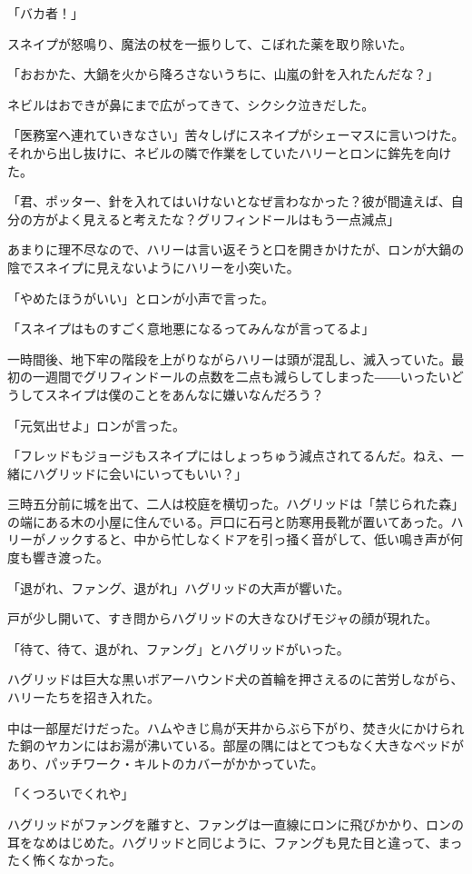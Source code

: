 \documentclass[10pt,a4paper]{article}
\begin{document}
\begin{CJK}{UTF8}{min}
「バカ者！」

スネイプが怒鳴り、魔法の杖を一振りして、こぼれた薬を取り除いた。

「おおかた、大鍋を火から降ろさないうちに、山嵐の針を入れたんだな？」

ネビルはおできが鼻にまで広がってきて、シクシク泣きだした。

「医務室へ連れていきなさい」苦々しげにスネイプがシェーマスに言いつけた。それから出し抜けに、ネビルの隣で作業をしていたハリーとロンに鉾先を向けた。

「君、ポッター、針を入れてはいけないとなぜ言わなかった？彼が間違えば、自分の方がよく見えると考えたな？グリフィンドールはもう一点減点」

あまりに理不尽なので、ハリーは言い返そうと口を開きかけたが、ロンが大鍋の陰でスネイプに見えないようにハリーを小突いた。

「やめたほうがいい」とロンが小声で言った。

「スネイプはものすごく意地悪になるってみんなが言ってるよ」

一時間後、地下牢の階段を上がりながらハリーは頭が混乱し、滅入っていた。最初の一週間でグリフィンドールの点数を二点も減らしてしまった――いったいどうしてスネイプは僕のことをあんなに嫌いなんだろう？

「元気出せよ」ロンが言った。

「フレッドもジョージもスネイプにはしょっちゅう減点されてるんだ。ねえ、一緒にハグリッドに会いにいってもいい？」

三時五分前に城を出て、二人は校庭を横切った。ハグリッドは「禁じられた森」の端にある木の小屋に住んでいる。戸口に石弓と防寒用長靴が置いてあった。ハリーがノックすると、中から忙しなくドアを引っ掻く音がして、低い鳴き声が何度も響き渡った。

「退がれ、ファング、退がれ」ハグリッドの大声が響いた。

戸が少し開いて、すき問からハグリッドの大きなひげモジャの顔が現れた。

「待て、待て、退がれ、ファング」とハグリッドがいった。

ハグリッドは巨大な黒いボアーハウンド犬の首輪を押さえるのに苦労しながら、ハリーたちを招き入れた。

中は一部屋だけだった。ハムやきじ鳥が天井からぶら下がり、焚き火にかけられた銅のヤカンにはお湯が沸いている。部屋の隅にはとてつもなく大きなベッドがあり、パッチワーク・キルトのカバーがかかっていた。

「くつろいでくれや」

ハグリッドがファングを離すと、ファングは一直線にロンに飛びかかり、ロンの耳をなめはじめた。ハグリッドと同じように、ファングも見た目と違って、まったく怖くなかった。


\end{CJK}
\end{document}
